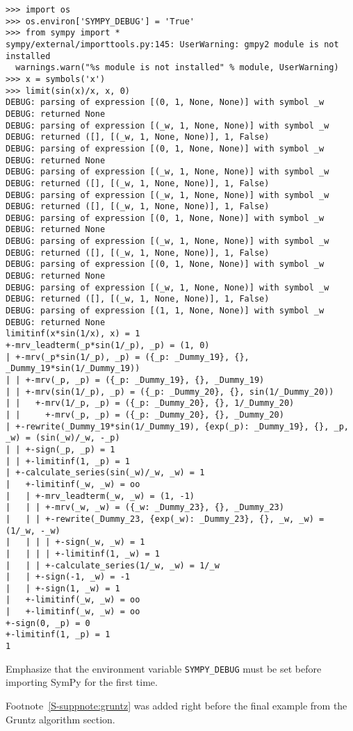 \documentclass[answers,12pt]{exam}
\begin{document}
\begin{questions}
\begin{verbatim}
>>> import os
>>> os.environ['SYMPY_DEBUG'] = 'True'
>>> from sympy import *
sympy/external/importtools.py:145: UserWarning: gmpy2 module is not installed
  warnings.warn("%s module is not installed" % module, UserWarning)
>>> x = symbols('x')
>>> limit(sin(x)/x, x, 0)
DEBUG: parsing of expression [(0, 1, None, None)] with symbol _w
DEBUG: returned None
DEBUG: parsing of expression [(_w, 1, None, None)] with symbol _w
DEBUG: returned ([], [(_w, 1, None, None)], 1, False)
DEBUG: parsing of expression [(0, 1, None, None)] with symbol _w
DEBUG: returned None
DEBUG: parsing of expression [(_w, 1, None, None)] with symbol _w
DEBUG: returned ([], [(_w, 1, None, None)], 1, False)
DEBUG: parsing of expression [(_w, 1, None, None)] with symbol _w
DEBUG: returned ([], [(_w, 1, None, None)], 1, False)
DEBUG: parsing of expression [(0, 1, None, None)] with symbol _w
DEBUG: returned None
DEBUG: parsing of expression [(_w, 1, None, None)] with symbol _w
DEBUG: returned ([], [(_w, 1, None, None)], 1, False)
DEBUG: parsing of expression [(0, 1, None, None)] with symbol _w
DEBUG: returned None
DEBUG: parsing of expression [(_w, 1, None, None)] with symbol _w
DEBUG: returned ([], [(_w, 1, None, None)], 1, False)
DEBUG: parsing of expression [(1, 1, None, None)] with symbol _w
DEBUG: returned None
limitinf(x*sin(1/x), x) = 1
+-mrv_leadterm(_p*sin(1/_p), _p) = (1, 0)
| +-mrv(_p*sin(1/_p), _p) = ({_p: _Dummy_19}, {}, _Dummy_19*sin(1/_Dummy_19))
| | +-mrv(_p, _p) = ({_p: _Dummy_19}, {}, _Dummy_19)
| | +-mrv(sin(1/_p), _p) = ({_p: _Dummy_20}, {}, sin(1/_Dummy_20))
| |   +-mrv(1/_p, _p) = ({_p: _Dummy_20}, {}, 1/_Dummy_20)
| |     +-mrv(_p, _p) = ({_p: _Dummy_20}, {}, _Dummy_20)
| +-rewrite(_Dummy_19*sin(1/_Dummy_19), {exp(_p): _Dummy_19}, {}, _p, _w) = (sin(_w)/_w, -_p)
| | +-sign(_p, _p) = 1
| | +-limitinf(1, _p) = 1
| +-calculate_series(sin(_w)/_w, _w) = 1
|   +-limitinf(_w, _w) = oo
|   | +-mrv_leadterm(_w, _w) = (1, -1)
|   | | +-mrv(_w, _w) = ({_w: _Dummy_23}, {}, _Dummy_23)
|   | | +-rewrite(_Dummy_23, {exp(_w): _Dummy_23}, {}, _w, _w) = (1/_w, -_w)
|   | | | +-sign(_w, _w) = 1
|   | | | +-limitinf(1, _w) = 1
|   | | +-calculate_series(1/_w, _w) = 1/_w
|   | +-sign(-1, _w) = -1
|   | +-sign(1, _w) = 1
|   +-limitinf(_w, _w) = oo
|   +-limitinf(_w, _w) = oo
+-sign(0, _p) = 0
+-limitinf(1, _p) = 1
1
\end{verbatim}

Emphasize that the environment variable \texttt{SYMPY\_DEBUG} must be set before importing SymPy for the first time.
\begin{solution}
Footnote~\ref{S-suppnote:gruntz} was added right before the final example from the Gruntz algorithm section.
\end{solution}


\end{questions}
\end{document}
